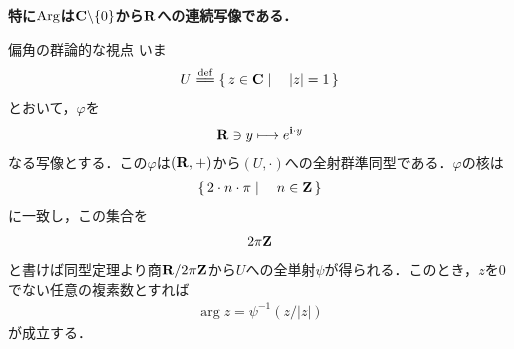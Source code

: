 	{\bf 特に$\operatorname{Arg}$は$\mathbf{C} \backslash \{0\}$から$\mathbf{R}$への連続写像である．}
	
	\begin{itembox}[l]{偏角の群論的な視点}
		いま
		\begin{align}
			U \defeq \Set{z \in \C}{|z| = 1}
		\end{align}
		とおいて，$\varphi$を
		\begin{align}
			\mathbf{R} \ni y \longmapsto e^{\mathbf{i} \cdot y}
		\end{align}
		なる写像とする．この$\varphi$は$(\mathbf{R},+)$から$(U,\cdot)$への全射群準同型である．$\varphi$の核は
		\begin{align}
			\left\{\, 2 \cdot n \cdot \pi \mid \quad n \in \mathbf{Z}\, \right\}
		\end{align}
		に一致し，この集合を
		\begin{align}
			2\pi\mathbf{Z}
		\end{align}
		と書けば同型定理より商$\mathbf{R}/2\pi\mathbf{Z}$から$U$への全単射$\psi$が得られる．このとき，$z$を$0$でない任意の複素数とすれば
		\begin{align}
			\arg{z} = \psi^{-1}(z/|z|)
		\end{align}
		が成立する．
	\end{itembox}